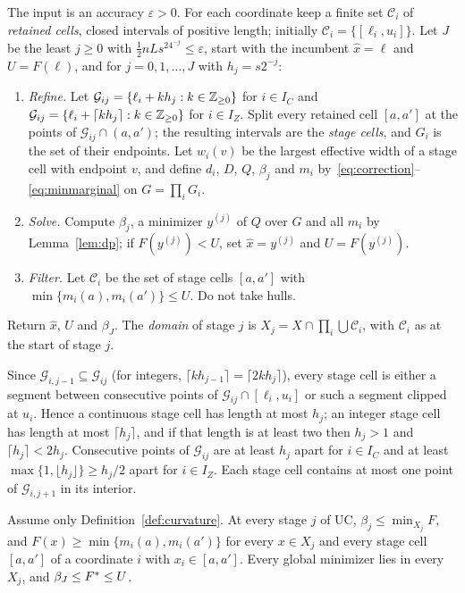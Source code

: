 \begin{algorithm}\label{alg:uc}
The input is an accuracy $\varepsilon>0$. For each coordinate keep a finite
set $\mathcal C_i$ of \emph{retained cells}, closed intervals of positive
length; initially $\mathcal C_i=\{[\ell_i,u_i]\}$. Let $J$ be the least
$j\ge0$ with $\frac12nLs^24^{-j}\le\varepsilon$, start with the incumbent
$\hat x=\ell$ and $U=F(\ell)$, and for $j=0,1,\dots,J$ with $h_j=s2^{-j}$:
\begin{enumerate}[label=(\roman*)]
\item \emph{Refine.} Let $\mathcal G_{ij}=\{\ell_i+kh_j:k\in\mathbb Z_{\ge0}\}$ for
$i\in I_C$ and $\mathcal G_{ij}=\{\ell_i+\lceil kh_j\rceil:k\in\mathbb Z_{\ge0}\}$ for
$i\in I_Z$. Split every retained cell $[a,a']$ at the points of
$\mathcal G_{ij}\cap(a,a')$; the resulting intervals are the \emph{stage
cells}, and $G_i$ is the set of their endpoints. Let $w_i(v)$ be the largest
effective width of a stage cell with endpoint $v$, and define $d_i$, $D$,
$Q$, $\beta_j$ and $m_i$ by~\eqref{eq:correction}--\eqref{eq:minmarginal} on
$G=\prod_iG_i$.
\item \emph{Solve.} Compute $\beta_j$, a minimizer $y^{(j)}$ of $Q$ over $G$
and all $m_i$ by Lemma~\ref{lem:dp}; if $F(y^{(j)})<U$, set $\hat x=y^{(j)}$
and $U=F(y^{(j)})$.
\item \emph{Filter.} Let $\mathcal C_i$ be the set of stage cells $[a,a']$
with $\min\{m_i(a),m_i(a')\}\le U$. Do not take hulls.
\end{enumerate}
Return $\hat x$, $U$ and $\beta_J$. The \emph{domain} of stage $j$ is
$X_j=X\cap\prod_i\bigcup\mathcal C_i$, with $\mathcal C_i$ as at the start of
stage $j$.
\end{algorithm}

Since $\mathcal G_{i,j-1}\subseteq\mathcal G_{ij}$ (for integers,
$\lceil kh_{j-1}\rceil=\lceil 2kh_j\rceil$), every stage cell is either a
segment between consecutive points of $\mathcal G_{ij}\cap[\ell_i,u_i]$ or
such a segment clipped at $u_i$. Hence a continuous stage cell has length at
most $h_j$; an integer stage cell has length at most $\lceil h_j\rceil$, and
if that length is at least two then $h_j>1$ and $\lceil h_j\rceil<2h_j$.
Consecutive points of $\mathcal G_{ij}$ are at least $h_j$ apart for
$i\in I_C$ and at least $\max\{1,\lfloor h_j\rfloor\}\ge h_j/2$ apart for
$i\in I_Z$. Each stage cell contains at most one point of
$\mathcal G_{i,j+1}$ in its interior.

\begin{lemma}\label{lem:cells}
Assume only Definition~\ref{def:curvature}. At every stage $j$ of UC,
$\beta_j\le\min_{X_j}F$, and $F(x)\ge\min\{m_i(a),m_i(a')\}$ for every
$x\in X_j$ and every stage cell $[a,a']$ of a coordinate $i$ with
$x_i\in[a,a']$. Every global minimizer lies in every $X_j$, and
$\beta_J\le F^{*}\le U$.
\end{lemma}

